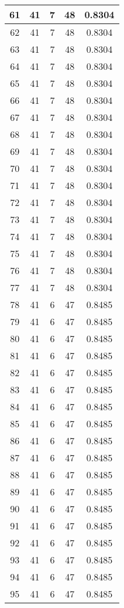 \documentclass[letterpaper, 12pt]{article}
\begin{document}
\begin{longtable}{|c|c|c|c|c|}
61 & 41 & 7 & 48 & 0.8304 \\
\hline
62 & 41 & 7 & 48 & 0.8304 \\
\hline
63 & 41 & 7 & 48 & 0.8304 \\
\hline
64 & 41 & 7 & 48 & 0.8304 \\
\hline
65 & 41 & 7 & 48 & 0.8304 \\
\hline
66 & 41 & 7 & 48 & 0.8304 \\
\hline
67 & 41 & 7 & 48 & 0.8304 \\
\hline
68 & 41 & 7 & 48 & 0.8304 \\
\hline
69 & 41 & 7 & 48 & 0.8304 \\
\hline
70 & 41 & 7 & 48 & 0.8304 \\
\hline
71 & 41 & 7 & 48 & 0.8304 \\
\hline
72 & 41 & 7 & 48 & 0.8304 \\
\hline
73 & 41 & 7 & 48 & 0.8304 \\
\hline
74 & 41 & 7 & 48 & 0.8304 \\
\hline
75 & 41 & 7 & 48 & 0.8304 \\
\hline
76 & 41 & 7 & 48 & 0.8304 \\
\hline
77 & 41 & 7 & 48 & 0.8304 \\
\hline
78 & 41 & 6 & 47 & 0.8485 \\
\hline
79 & 41 & 6 & 47 & 0.8485 \\
\hline
80 & 41 & 6 & 47 & 0.8485 \\
\hline
81 & 41 & 6 & 47 & 0.8485 \\
\hline
82 & 41 & 6 & 47 & 0.8485 \\
\hline
83 & 41 & 6 & 47 & 0.8485 \\
\hline
84 & 41 & 6 & 47 & 0.8485 \\
\hline
85 & 41 & 6 & 47 & 0.8485 \\
\hline
86 & 41 & 6 & 47 & 0.8485 \\
\hline
87 & 41 & 6 & 47 & 0.8485 \\
\hline
88 & 41 & 6 & 47 & 0.8485 \\
\hline
89 & 41 & 6 & 47 & 0.8485 \\
\hline
90 & 41 & 6 & 47 & 0.8485 \\
\hline
91 & 41 & 6 & 47 & 0.8485 \\
\hline
92 & 41 & 6 & 47 & 0.8485 \\
\hline
93 & 41 & 6 & 47 & 0.8485 \\
\hline
94 & 41 & 6 & 47 & 0.8485 \\
\hline
95 & 41 & 6 & 47 & 0.8485 \\

\end{longtable}
\end{document}
